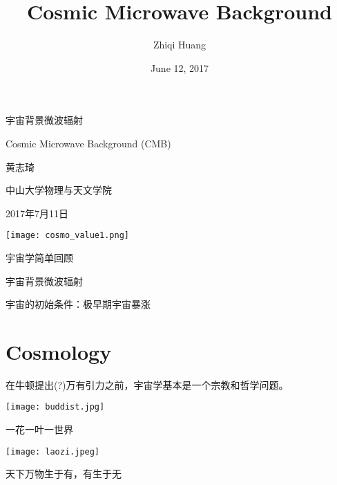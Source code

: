 \documentclass[CJK]{beamer}
\title{Cosmic Microwave Background}
\author{Zhiqi Huang}
\institute{Sun Yat-sen University}
\date{June 12, 2017}
\begin{document}
\begin{frame}
  \bch
  \bcenter
      {\Huge 宇宙背景微波辐射}
      
      {\Huge Cosmic Microwave Background (CMB)}      

      
      {\Large 黄志琦}

      \skipline
      
      中山大学物理与天文学院 
      
      {2017年7月11日}
      \ecenter
      \ech
\end{frame}



\begin{frame}
\centering
\texttt{[image: cosmo\_value1.png]}
\end{frame}


\begin{frame}
\centering
\bch
\bitem
\item{宇宙学简单回顾}
\item{宇宙背景微波辐射}
\item{宇宙的初始条件：极早期宇宙暴涨}
  \eitem
  \ech
\end{frame}

\section{Cosmology}


\begin{frame}
  \bch
  在牛顿提出(?)万有引力之前，宇宙学基本是一个宗教和哲学问题。
  \ech
\end{frame}


\begin{frame}
\bch
\begin{minipage}{0.45\textwidth}
\texttt{[image: buddist.jpg]}
\end{minipage}
\begin{minipage}{0.45\textwidth}
{\Large 一花一叶一世界}
\end{minipage}
\ech
\end{frame}


\begin{frame}
\bch
\begin{minipage}{0.45\textwidth}
\texttt{[image: laozi.jpeg]}
\end{minipage}
\begin{minipage}{0.45\textwidth}
{\Large 天下万物生于有，有生于无}
\end{minipage}
\ech
\end{frame}
\end{document}
